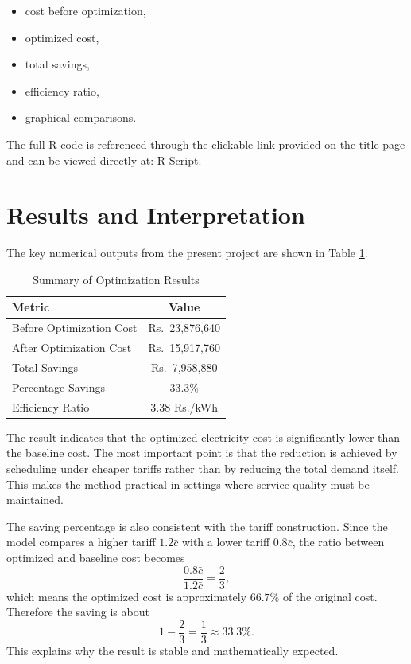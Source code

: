 \documentclass[12pt,a4paper]{article}
\newcommand{\rcodefile}{\href{https://github.com/rangerbelx/Electricity-Bill-Minimization-Using-Linear-Optimization/blob/main/electricity_optimization.R}{R Script}}
\begin{document}
\begin{itemize}[leftmargin=*]
  \item cost before optimization,
  \item optimized cost,
  \item total savings,
  \item efficiency ratio,
  \item graphical comparisons.
\end{itemize}

The full R code is referenced through the clickable link provided on the title page and can be viewed directly at: \rcodefile.

\section{Results and Interpretation}

The key numerical outputs from the present project are shown in Table \ref{tab:results}.

\begin{table}[H]
\centering
\caption{Summary of Optimization Results}
\label{tab:results}
\renewcommand{\arraystretch}{1.2}
\begin{tabular}{lc}
\toprule
\textbf{Metric} & \textbf{Value} \\
\midrule
Before Optimization Cost & Rs.\ 23,876,640 \\
After Optimization Cost & Rs.\ 15,917,760 \\
Total Savings & Rs.\ 7,958,880 \\
Percentage Savings & 33.3\% \\
Efficiency Ratio & 3.38 Rs./kWh \\
\bottomrule
\end{tabular}
\end{table}

The result indicates that the optimized electricity cost is significantly lower than the baseline cost. The most important point is that the reduction is achieved by scheduling under cheaper tariffs rather than by reducing the total demand itself. This makes the method practical in settings where service quality must be maintained.

The saving percentage is also consistent with the tariff construction. Since the model compares a higher tariff \(1.2\bar{c}\) with a lower tariff \(0.8\bar{c}\), the ratio between optimized and baseline cost becomes
\[
\frac{0.8\bar{c}}{1.2\bar{c}}=\frac{2}{3},
\]
which means the optimized cost is approximately \(66.7\%\) of the original cost. Therefore the saving is about
\[
1-\frac{2}{3}=\frac{1}{3}\approx 33.3\%.
\]
This explains why the result is stable and mathematically expected.
\end{document}
